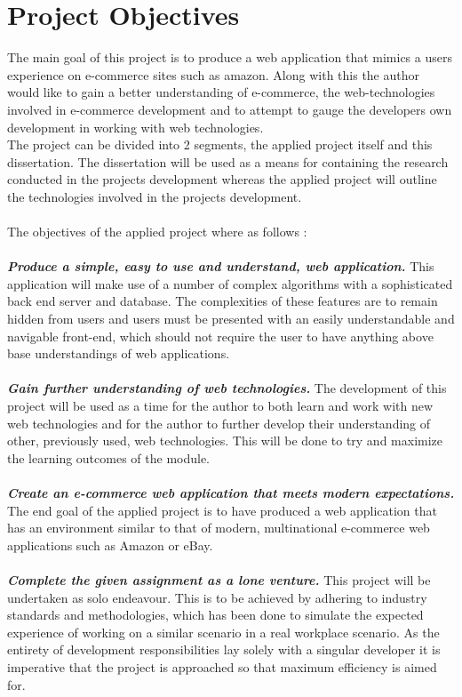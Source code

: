 \section{Project Objectives} 
The main goal of this project is to produce a web application that mimics a users experience on e-commerce sites such as amazon. Along with this the author would like to gain a better understanding of e-commerce, the web-technologies involved in e-commerce development and to attempt to gauge the developers own development in working with web technologies. \\
The project can be divided into 2 segments, the applied project itself and this  dissertation. The dissertation will be used as a means for containing the research conducted in the projects development whereas the applied project will outline the technologies involved in the projects development. \\ \\
The objectives of the applied project where as follows : \\ \\
\textbf{\emph{Produce a simple, easy to use and understand, web application.}} This application will make use of a number of complex algorithms with a sophisticated back end server and database. The complexities of these features are to remain hidden from users and users must be presented with an easily understandable and navigable front-end, which should not require the user to have anything above base understandings of web applications. \\ \\
\textbf{\emph{Gain further understanding of web technologies.}} The development of this project will be used as a time for the author to both learn and work with new web technologies and for the author to further develop their understanding of other, previously used, web technologies. This will be done to try and maximize the learning outcomes of the module. \\  \\
\textbf{\emph{Create an e-commerce web application that meets modern expectations.}} The end goal of the applied project is to have produced a web application that has an environment similar to that of modern, multinational e-commerce web applications such as Amazon or eBay. \\  \\
\textbf{\emph{Complete the given assignment as a lone venture.}} This project will be undertaken as solo endeavour. This is to be achieved by adhering to industry standards and methodologies, which has been done to simulate the expected experience of working on a similar scenario in a real workplace scenario. As the entirety of development responsibilities lay solely with a singular developer it is imperative that the project is approached so that maximum efficiency is aimed for. \\ \\
\newpage

